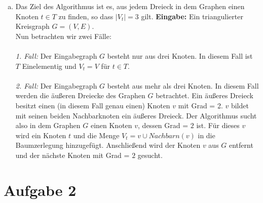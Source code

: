 \documentclass[12pt,a4paper]{article}
\begin{document}
\begin{enumerate}[a)]
	\item Das Ziel des Algorithmus ist es, aus jedem Dreieck in dem Graphen einen Knoten $t \in T$ zu finden, so dass $|V_t| = 3$ gilt. \textbf{Eingabe:} Ein triangulierter Kreisgraph $G=(V,E)$. \\
	Nun betrachten wir zwei Fälle: \\
	\\
	\textit{1. Fall:} Der Eingabegraph $G$ besteht nur aus drei Knoten. In diesem Fall ist $T$ Einelementig und $V_t=V$ für $t\in T$. \\
	\\
	\textit{2. Fall:} Der Eingabegraph $G$ besteht aus mehr als drei Knoten. In diesem Fall werden die äußeren Dreiecke des Graphen $G$ betrachtet. Ein äußeres Dreieck besitzt einen (in diesem Fall genau einen) Knoten $v$ mit Grad = 2. $v$ bildet mit seinen beiden Nachbarknoten ein äußeres Dreieck. Der Algorithmus sucht also in dem Graphen $G$ einen Knoten $v$, dessen Grad = $2$ ist. Für dieses $v$ wird ein Knoten $t$ und die Menge $V_t = {v} \cup {Nachbarn(v)}$ in die Baumzerlegung hinzugefügt. Anschließend wird der Knoten $v$ aus $G$ entfernt und der nächste Knoten mit Grad = $2$ gesucht.     
\end{enumerate}

\section*{Aufgabe 2}
\end{document}
